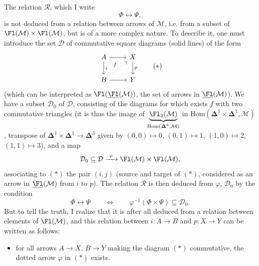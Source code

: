 \begin{itemize}[leftmargin=2.5em]
The relation $\mathcal{R}$, which I write
\[
\Phi\longleftrightarrow\Psi,
\]
is not deduced from a relation between arrows of $\mathcal{M}$, i.e. from a subset of $\Fl(\mathcal{M})\times\Fl(\mathcal{M})$, but is of a more complex nature. To describe it, one must introduce the set $\mathcal{D}$ of commutative square diagrams (solid lines) of the form
\[
\begin{tikzcd}
A \arrow[r] \arrow[d, "i"] & X \arrow[d, "p"] \\
B \arrow[r] \arrow[ur, dotted, "f"] & Y
\end{tikzcd}
\tag*{$(*)$}
\]
(which can be interpreted as $\Fl(\underline{\Fl}(\mathcal{M}))$, the set of arrows in $\underline{\Fl}(\mathcal{M})$). We have a subset $\mathcal{D}_0$ of $\mathcal{D}$, consisting of the diagrams for which exists $f$ with two commutative triangles (it is thus the image of $\underbrace{\Fl_3(\mathcal{M})}_{\mathrm{Hom}(\boldsymbol{\Delta}^3,\mathcal{M})}$ in $\mathrm{Hom}(\boldsymbol{\Delta}^1\times\boldsymbol{\Delta}^1,\mathcal{M})$, transpose of $\boldsymbol{\Delta}^1\times\boldsymbol{\Delta}^1\longrightarrow\boldsymbol{\Delta}^3$ given by $(0,0)\longmapsto 0$, $(0,1)\longmapsto 1$, $(1,0)\longmapsto 2$, $(1,1)\longmapsto 3$), and a map
\[
\mathcal{D}_0\subseteq\mathcal{D}\xrightarrow{\ \varphi\ }\Fl(\mathcal{M})\times\Fl(\mathcal{M}),
\]
associating to $(*)$ the pair $(i,j)$ (source and target of $(*)$, considered as an arrow in $\underline{\Fl}(\mathcal{M})$ from $i$ to $p$). The relation $\mathcal{R}$ is then deduced from $\varphi$, $\mathcal{D}_0$ by the condition
\[
\Phi\longleftrightarrow\Psi\qquad\Longleftrightarrow\qquad\varphi^{-1}(\Phi\times\Psi)\subseteq\mathcal{D}_0.
\]
But to tell the truth, I realize that it is after all deduced from a relation between elements of $\Fl(\mathcal{M})$, and this relation between $i : A\longrightarrow B$ and $p : X\longrightarrow Y$ can be written as follows:
\begin{itemize}[leftmargin=3em]
\item[$(**)$] for all arrows $A\longrightarrow X$, $B\longrightarrow Y$ making the diagram $(*)$ commutative, the dotted arrow $\varphi$ in $(*)$ exists. %
\end{itemize}
\end{itemize}

